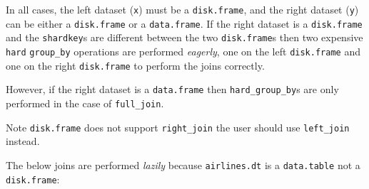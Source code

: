 \documentclass[]{book}
\begin{document}
In all cases, the left dataset (\texttt{x}) must be a \texttt{disk.frame}, and the right dataset (\texttt{y}) can be either a \texttt{disk.frame} or a \texttt{data.frame}. If the right dataset is a \texttt{disk.frame} and the \texttt{shardkey}s are different between the two \texttt{disk.frame}s then two expensive \texttt{hard} \texttt{group\_by} operations are performed \emph{eagerly}, one on the left \texttt{disk.frame} and one on the right \texttt{disk.frame} to perform the joins correctly.

However, if the right dataset is a \texttt{data.frame} then \texttt{hard\_group\_by}s are only performed in the case of \texttt{full\_join}.

Note \texttt{disk.frame} does not support \texttt{right\_join} the user should use \texttt{left\_join} instead.

The below joins are performed \emph{lazily} because \texttt{airlines.dt} is a \texttt{data.table} not a \texttt{disk.frame}:
\end{document}
